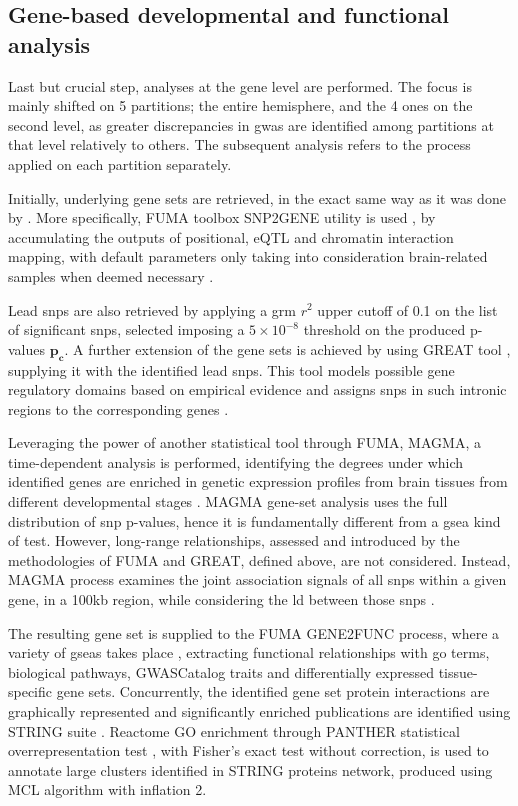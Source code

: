 \subsection{Gene-based developmental and functional analysis}
\label{subsec:func_mat_methods}
Last but crucial step, analyses at the gene level are performed. The focus is mainly shifted on 5 partitions; the entire hemisphere, and the 4 ones on the second level, as greater discrepancies in \ac{gwas} are identified among partitions at that level relatively to others. The subsequent analysis refers to the process applied on each partition separately.

Initially, underlying gene sets are retrieved, in the exact same way as it was done by \citet{Sha2021}. More specifically, FUMA toolbox SNP2GENE  utility is used \cite{Watanabe2017}, by accumulating the outputs of positional, eQTL and chromatin interaction mapping, with default parameters only taking into consideration brain-related samples when deemed necessary \cite{Sha2021,Watanabe2017}. 

Lead \acp{snp} are also retrieved by applying a \ac{grm} $r^2$ upper cutoff of 0.1 on the list of significant \acp{snp}, selected imposing a $5\times 10 ^ {-8}$ threshold on the produced p-values $\mathbf{p_c}$. A further extension of the gene sets is achieved by using GREAT tool \cite{McLean2010}, supplying it with the identified lead \acp{snp}. This tool models possible gene regulatory domains based on empirical evidence and assigns \acp{snp} in such intronic regions to the corresponding genes \cite{McLean2010}.

Leveraging the power of another statistical tool through FUMA, MAGMA, a time-dependent analysis is performed, identifying the degrees under which identified genes are enriched in genetic expression profiles from brain tissues from different developmental stages \cite{DeLeeuw2015}. MAGMA gene-set analysis uses the full distribution of \ac{snp} p-values, hence it is fundamentally different from a \ac{gsea} kind of test. However, long-range relationships, assessed and introduced by the methodologies of FUMA and GREAT, defined above, are not considered. Instead, MAGMA process examines the joint association signals of all \acp{snp} within a given gene, in a 100kb region, while considering the \ac{ld} between those \acp{snp} \cite{DeLeeuw2015,Sha2021}.

The resulting gene set is supplied to the FUMA GENE2FUNC process, where a variety of \acp{gsea} takes place \cite{Watanabe2017}, extracting functional relationships with \ac{go} terms, biological pathways, GWASCatalog traits and differentially expressed tissue-specific gene sets. Concurrently, the identified gene set protein interactions are graphically represented and significantly enriched publications are identified using STRING suite \cite{Szklarczyk2021}. Reactome GO enrichment through PANTHER statistical overrepresentation test \cite{Mi2019}, with Fisher's exact test without correction, is used to annotate large clusters identified in STRING proteins network, produced using MCL algorithm with inflation 2.

	


